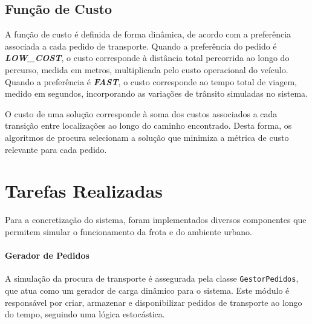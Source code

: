\documentclass[11pt, a4paper, fleqn]{article}
\begin{document}
	\subsection{Função de Custo}
	
	A função de custo é definida de forma dinâmica, de acordo com a preferência associada a cada pedido de transporte. Quando a preferência do pedido é \textbf{\textit{LOW\_COST}}, o custo corresponde à distância total percorrida ao longo do percurso, medida em metros, multiplicada pelo custo operacional do veículo. Quando a preferência é \textbf{\textit{FAST}}, o custo corresponde ao tempo total de viagem, medido em segundos, incorporando as variações de trânsito simuladas no sistema.
	
	O custo de uma solução corresponde à soma dos custos associados a cada transição entre localizações ao longo do caminho encontrado. Desta forma, os algoritmos de procura selecionam a solução que minimiza a métrica de custo relevante para cada pedido.
	
	\section{Tarefas Realizadas}
	
	Para a concretização do sistema, foram implementados diversos componentes que permitem simular o funcionamento da frota e do ambiente urbano.
	
	\paragraph{Gerador de Pedidos}
	A simulação da procura de transporte é assegurada pela classe \texttt{GestorPedidos}, que atua como um gerador de carga dinâmico para o sistema. Este módulo é responsável por criar, armazenar e disponibilizar pedidos de transporte ao longo do tempo, seguindo uma lógica estocástica.
	
\end{document}

